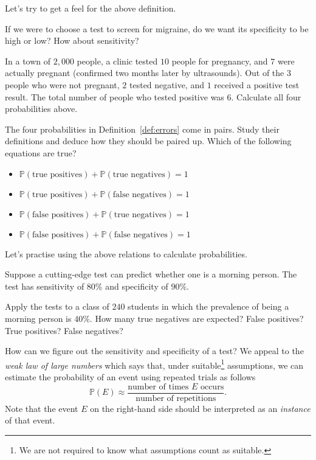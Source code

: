 \documentclass[../main.tex]{subfiles}
\begin{document}
Let's try to get a feel for the above definition.
\begin{example}
  If we were to choose a test to screen for migraine, do we want its specificity to be high or low? How about sensitivity?
\end{example}
\clearpage

\begin{example}
  In a town of \(2,000\) people, a clinic tested \(10\) people for pregnancy, and \(7\) were actually pregnant (confirmed two months later by ultrasounds).  Out of the \(3\) people who were not pregnant, \(2\) tested negative, and \(1\) received a positive test result.  The total number of people who tested positive was \(6\). Calculate all four probabilities above.
\end{example}

\faStar{} The four probabilities in Definition~\ref{def:errors} come in pairs.  Study their definitions and deduce how they should be paired up. Which of the following equations are true?

\begin{itemize}[wide]
  \item \(\mathbb{P}(\text{true positives}) + \mathbb{P}(\text{true negatives}) = 1\)
  \item \(\mathbb{P}(\text{true positives}) + \mathbb{P}(\text{false negatives}) = 1\)
  \item \(\mathbb{P}(\text{false positives}) + \mathbb{P}(\text{true negatives}) = 1\)
  \item \(\mathbb{P}(\text{false positives}) + \mathbb{P}(\text{false negatives}) = 1\)
\end{itemize}
\clearpage

Let's practise using the above relations to calculate probabilities.
\begin{example}
  Suppose a cutting-edge test can predict whether one is a morning person. The test has sensitivity of \(80\%\) and specificity of \(90\%\). 

  Apply the tests to a class of \(240\) students in which the prevalence of being a morning person is \(40\%\).  How many true negatives are expected? False positives? True positives? False negatives?
\end{example}
\clearpage


How can we figure out the sensitivity and specificity of a test? We appeal to the \emph{weak law of large numbers} which says that, under suitable\footnote{We are not required to know what assumptions count as suitable.} assumptions, we can estimate the probability of an event using repeated trials as follows
\[
  \mathbb{P}(E) \approx \frac{\text{number of times \(E\) occurs}}{\text{number of repetitions}}.
\]
Note that the event \(E\) on the right-hand side should be interpreted as an \emph{instance} of that event. 
\end{document}
